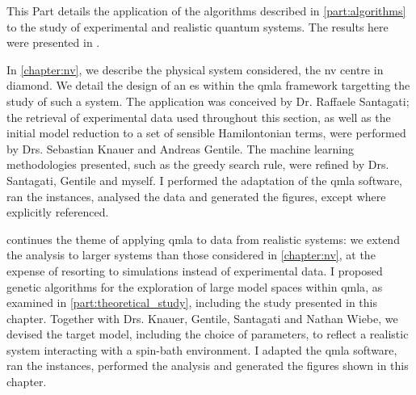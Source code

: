 
This Part details the application of the algorithms described in \cref{part:algorithms}
    to the study of experimental and realistic quantum systems.
The results here were presented in \cite{gentile2020learning}. 
\par 
\vspace{1cm}

In \cref{chapter:nv}, we describe the physical system considered, 
    the \acrfull{nv} centre in diamond. 
We detail the design of an \gls{es} within the \gls{qmla} framework
    targetting the study of such a system. 
The application was conceived by Dr. Raffaele Santagati; 
    the retrieval of experimental data used throughout this section, 
    as well as the initial model reduction to a set of sensible Hamilontonian terms,
    were performed by Drs. Sebastian Knauer and Andreas Gentile. 
The machine learning methodologies presented, 
    such as the greedy search rule, were refined by Drs. Santagati, Gentile and myself. 
I performed the adaptation of the \gls{qmla} software, 
    ran the instances, analysed the data and generated the figures, except where explicitly referenced.
\par 
\vspace{1cm}

 continues the theme of applying \gls{qmla} to data from realistic systems: 
    we extend the analysis to larger systems than those considered in \cref{chapter:nv}, 
    at the expense of resorting to simulations instead of experimental data. 
I proposed genetic algorithms for the exploration of large model spaces within \gls{qmla}, 
    as examined in \cref{part:theoretical_study}, including the study presented in this chapter. 
Together with Drs. Knauer, Gentile, Santagati and Nathan Wiebe, we devised the target model, 
    including the choice of parameters, to reflect a realistic system 
    interacting with a spin-bath environment.
I adapted the \gls{qmla} software, ran the instances, performed the analysis and generated the figures 
    shown in this chapter. 


